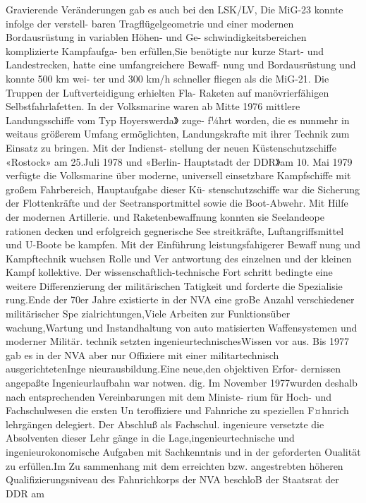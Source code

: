 Gravierende Veränderungen gab es auch bei den
LSK/LV, Die MiG-23 konnte infolge der verstell-
baren Tragflügelgeometrie und einer modernen
Bordausrüstung in variablen Höhen- und Ge-
schwindigkeitsbereichen komplizierte Kampfaufga-
ben erfüllen,Sie benötigte nur kurze Start- und
Landestrecken, hatte eine umfangreichere Bewaff-
nung und Bordausrüstung und konnte 500 km wei-
ter und 300 km/h schneller fliegen als die MiG-21. Die Truppen der Luftverteidigung erhielten Fla-
Raketen auf manövrierfähigen Selbstfahrlafetten.
In der Volksmarine waren ab Mitte 1976 mittlere
Landungsschiffe vom Typ Hoyerswerda》 zuge-
f¼hrt worden, die es nunmehr in weitaus größerem
Umfang ermöglichten, Landungskrafte mit ihrer
Technik zum Einsatz zu bringen. Mit der Indienst-
stellung der neuen Küstenschutzschiffe «Rostock»
am 25.Juli 1978 und «Berlin- Hauptstadt der
DDR》am 10. Mai 1979 verfügte die Volksmarine
über moderne, universell einsetzbare Kampfschiffe
mit großem Fahrbereich, Hauptaufgabe dieser Kü-
stenschutzschiffe war die Sicherung
der Flottenkräfte und der Seetransportmittel sowie die
Boot-Abwehr. Mit Hilfe der modernen Artillerie.
und Raketenbewaffnung konnten sie Seelandeope
rationen decken und erfolgreich gegnerische See
streitkräfte, Luftangriffsmittel und U-Boote be
kampfen.
Mit der Einführung leistungsfahigerer Bewaff
nung und Kampftechnik wuchsen Rolle und Ver
antwortung des einzelnen und der kleinen Kampf
kollektive. Der wissenschaftlich-technische Fort
schritt bedingte eine weitere Differenzierung der
militärischen Tatigkeit und forderte die Spezialisie
rung.Ende der 70er Jahre existierte in der NVA
eine groBe Anzahl verschiedener militärischer Spe
zialrichtungen,Viele Arbeiten zur Funktionsüber
wachung,Wartung und Instandhaltung von auto
matisierten Waffensystemen und moderner Militär.
technik setzten ingenieurtechnischesWissen vor
aus.
Bis 1977 gab es in der NVA aber nur Offiziere
mit einer militartechnisch ausgerichtetenInge
nieurausbildung.Eine neue,den objektiven Erfor-
dernissen angepaßte Ingenieurlaufbahn war notwen.
dig. Im November 1977wurden deshalb nach
entsprechenden Vereinbarungen mit dem Ministe-
rium für Hoch- und Fachschulwesen die ersten Un
teroffiziere und Fahnriche zu speziellen F¤hnrich
lehrgängen delegiert. Der Abschluß als Fachschul.
ingenieure versetzte die Absolventen dieser Lehr
gänge in die Lage,ingenieurtechnische und
ingenieurokonomische Aufgaben mit Sachkenntnis
und in der geforderten Oualität zu erfüllen.Im Zu
sammenhang mit dem erreichten bzw. angestrebten
höheren Qualifizierungsniveau des Fahnrichkorps
der NVA beschloB der Staatsrat der DDR am
